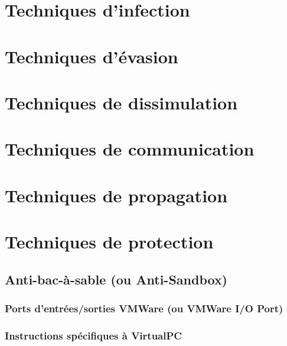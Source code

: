 \documentclass[10pt,a4paper]{article}
\begin{document}
\section{Techniques d'infection}

\section{Techniques d'évasion}

\section{Techniques de dissimulation}

\section{Techniques de communication}

\section{Techniques de propagation}

\section{Techniques de protection}
\subsection{Anti-bac-à-sable (ou Anti-Sandbox)}
\subsubsection{Ports d'entrées/sorties VMWare (ou VMWare I/O Port)} 
 
\subsubsection{Instructions spécifiques à VirtualPC}                
 
\end{document}
